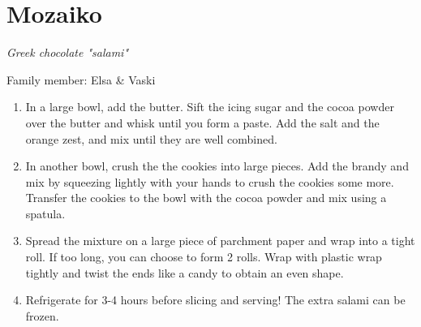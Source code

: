 \chapter{Mozaiko}
\label{ch:mozaiko}



\textit{Greek chocolate "salami"}

Family member: Elsa \& Vaski

\begin{enumerate}
    \item In a large bowl, add the butter. Sift the icing sugar and the cocoa powder over the butter and whisk until you form a paste. Add the salt and the orange zest, and mix until they are well combined.
    \item In another bowl, crush the the cookies into large pieces. Add the brandy and mix by squeezing lightly with your hands to crush the cookies some more. Transfer the cookies to the bowl with the cocoa powder and mix using a spatula.
    \item Spread the mixture on a large piece of parchment paper and wrap into a tight roll. If too long, you can choose to form 2 rolls. Wrap with plastic wrap tightly and twist the ends like a candy to obtain an even shape.
    \item Refrigerate for 3-4 hours before slicing and serving! The extra salami can be frozen.
\end{enumerate}
